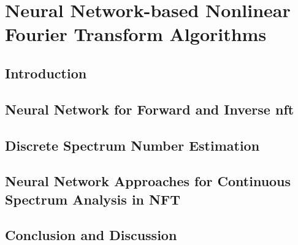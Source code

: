 \chapter{Neural Network-based Nonlinear Fourier Transform Algorithms}

\section{Introduction}


\section{Neural Network for Forward and Inverse \Gls{nft}}


\section{Discrete Spectrum Number Estimation}



\section{Neural Network Approaches for Continuous Spectrum Analysis in NFT}





\section{Conclusion and Discussion}






